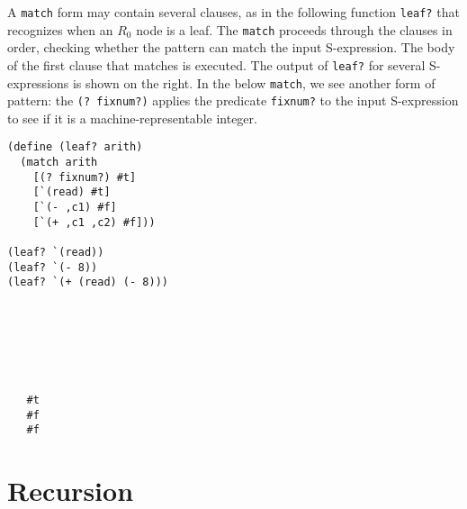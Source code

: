 \documentclass[11pt]{book}
\begin{document}
A \texttt{match} form may contain several clauses, as in the following
function \texttt{leaf?} that recognizes when an $R_0$ node is
a leaf. The \texttt{match} proceeds through the clauses in order,
checking whether the pattern can match the input S-expression. The
body of the first clause that matches is executed. The output of
\texttt{leaf?} for several S-expressions is shown on the right. In the
below \texttt{match}, we see another form of pattern: the \texttt{(?
  fixnum?)} applies the predicate \texttt{fixnum?} to the input
S-expression to see if it is a machine-representable integer.
\begin{center}
\begin{minipage}{0.5\textwidth}
\begin{lstlisting}
(define (leaf? arith)
  (match arith
    [(? fixnum?) #t]
    [`(read) #t]
    [`(- ,c1) #f]
    [`(+ ,c1 ,c2) #f]))

(leaf? `(read))
(leaf? `(- 8))
(leaf? `(+ (read) (- 8)))
\end{lstlisting}
\end{minipage}
\vrule
\begin{minipage}{0.25\textwidth}
\begin{lstlisting}






   #t
   #f
   #f
\end{lstlisting}
\end{minipage}
\end{center}


\section{Recursion}
\label{sec:recursion}
\end{document}
